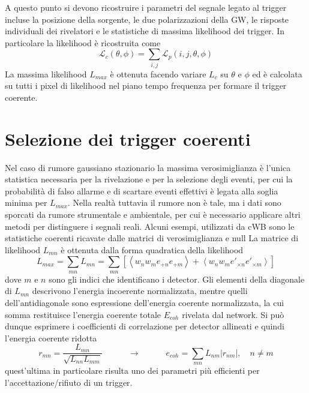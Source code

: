 A questo punto si devono ricostruire i parametri del segnale legato al trigger incluse la posizione della sorgente, le due polarizzazioni della GW, le risposte individuali dei rivelatori e le statistiche di massima likelihood dei trigger. In particolare la likelihood è ricostruita come
\begin{equation}
	\mathcal{L}_c(\theta,\phi) = \sum_{i,j}\mathcal{L}_p(i,j,\theta, \phi)
\end{equation}
La massima likelihood $L_{max}$ è ottenuta facendo variare $L_c$ su $\theta$ e $\phi$ ed è calcolata su tutti i pixel di likelihood nel piano tempo frequenza per formare il trigger coerente\cite{Klimenko_2008}.
\section{Selezione dei trigger coerenti}
Nel caso di rumore gaussiano stazionario la massima verosimiglianza è l'unica statistica necessaria per la rivelazione e per la selezione degli eventi, per cui la probabilità di falso allarme e di scartare eventi effettivi è legata alla soglia minima per $L_{max}$. Nella realtà tuttavia il rumore non è tale, ma i dati sono sporcati da rumore strumentale e ambientale, per cui è necessario applicare altri metodi per distinguere i segnali reali. Alcuni esempi, utilizzati da cWB sono le statistiche coerenti ricavate dalle matrici di verosimiglianza e null
La matrice di likelihood $L_{mn}$ è ottenuta dalla forma quadratica della likelihood
\begin{equation}
	L_{max} = \sum_{mn}L_{mn} = \sum_{mn}\left[\left< w_nw_me_{+n}e_{+m} \right> + \left< w_nw_me'_{\times n}e'_{\times m} \right>\right]
	\label{eqn:likelihood_matrix}
\end{equation}
dove $m\text{ e }n$ sono gli indici che identificano i detector. Gli elementi della diagonale di $L_{mn}$ descrivono l'energia incoerente normalizzata, mentre quelli dell'antidiagonale sono espressione dell'energia coerente normalizzata, la cui somma restituisce l'energia coerente totale $E_{coh}$ rivelata dal network. Si può dunque esprimere i coefficienti di correlazione per detector allineati e quindi l'energia coerente ridotta
\begin{equation}
	r_{mn} = \frac{L_{mn}}{\sqrt{L_{nn}L_{mm}}} \quad\quad\quad \rightarrow \quad\quad\quad e_{coh}=\sum_{mn}L_{nm}|r_{nm}|, \quad n\neq m
	\label{eqn:coherent_energy}
\end{equation}
quest'ultima in particolare risulta uno dei parametri più efficienti per l'accettazione/rifiuto di un trigger.

